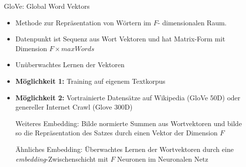 \documentclass[8pt, xcolor = dvipsnames]{beamer}
\begin{document}
\begin{frame}{GloVe: Global Word Vektors}


\begin{itemize}
    \item Methode zur Repräsentation von Wörtern im $F$- dimensionalen Raum.
    \item Datenpunkt ist Sequenz aus Wort Vektoren und hat Matrix-Form mit Dimension $F \times maxWords$
    \item Unüberwachtes Lernen der Vektoren
    \item \textbf{Möglichkeit 1:} Training auf eigenem Textkorpus
    \item \textbf{Möglichkeit 2:} Vortrainierte Datensätze auf Wikipedia (GloVe 50D) oder genereller Internet Crawl (Glove 300D)
\begin{block}{Weiteres Embedding:}
Bilde normierte Summen aus Wortvektoren und bilde so die Repräsentation des Satzes durch einen Vektor der Dimension $F$
\end{block}{}
\begin{block}{Ähnliches Embedding:}
Überwachtes Lernen der Wortvektoren durch eine \textit{embedding}-Zwischenschicht mit $F$ Neuronen im Neuronalen Netz
\end{block}{}

\end{itemize}{}

\end{frame}{}
\end{document}
